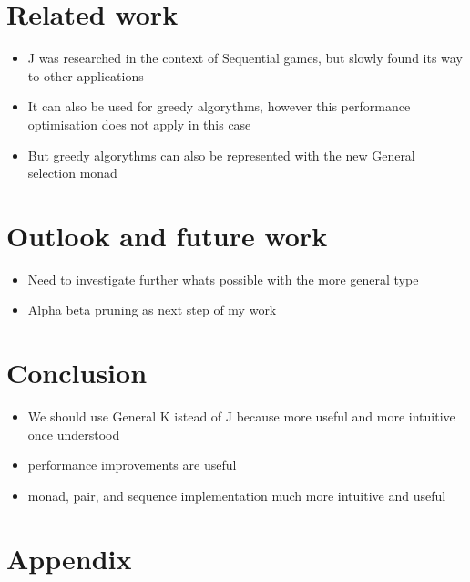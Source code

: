\documentclass[runningheads]{llncs}
\providecommand{\tightlist}{%
  \setlength{\itemsep}{0pt}\setlength{\parskip}{0pt}}
\begin{document}
\section{Related work}\label{related-work}

\begin{itemize}
\item
  J was researched in the context of Sequential games, but slowly found
  its way to other applications
\item
  It can also be used for greedy algorythms, however this performance
  optimisation does not apply in this case
\item
  But greedy algorythms can also be represented with the new General
  selection monad
\end{itemize}

\section{Outlook and future work}\label{outlook-and-future-work}

\begin{itemize}
\tightlist
\item
  Need to investigate further whats possible with the more general type
\item
  Alpha beta pruning as next step of my work
\end{itemize}

\section{Conclusion}\label{conclusion}

\begin{itemize}
\tightlist
\item
  We should use General K istead of J because more useful and more
  intuitive once understood
\item
  performance improvements are useful
\item
  monad, pair, and sequence implementation much more intuitive and
  useful
\end{itemize}

%
%
%
% 
% 
%



\newpage
\section*{Appendix}
\appendix
\end{document}
